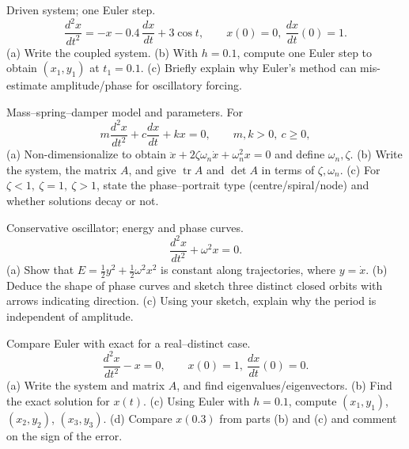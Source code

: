 \documentclass[11pt]{article}
\def\textbf#1{#1}%
\newcounter{question}
\begin{document}
\begin{question}
\textbf{Driven system; one Euler step.}
\[
\frac{d^{2}x}{dt^{2}}=-x-0.4\,\frac{dx}{dt}+3\cos t,\qquad x(0)=0,\ \frac{dx}{dt}(0)=1.
\]
(a) Write the coupled system.  
(b) With \(h=0.1\), compute one Euler step to obtain \((x_1,y_1)\) at \(t_1=0.1\).  
(c) Briefly explain why Euler’s method can mis-estimate amplitude/phase for oscillatory forcing.
\end{question}

\begin{question}
\textbf{Mass–spring–damper model and parameters.}
For
\[
m\frac{d^{2}x}{dt^{2}}+c\frac{dx}{dt}+kx=0,\qquad m,k>0,\ c\ge0,
\]
(a) Non-dimensionalize to obtain \(\ddot x+2\zeta\omega_n \dot x+\omega_n^2 x=0\) and define \(\omega_n,\zeta\).  
(b) Write the system, the matrix \(A\), and give \(\operatorname{tr}A\) and \(\det A\) in terms of \(\zeta,\omega_n\).  
(c) For \(\zeta<1,\ \zeta=1,\ \zeta>1\), state the phase–portrait type (centre/spiral/node) and whether solutions decay or not.
\end{question}

\begin{question}
\textbf{Conservative oscillator; energy and phase curves.}
\[
\frac{d^{2}x}{dt^{2}}+\omega^{2}x=0.
\]
(a) Show that \(E=\tfrac12 y^{2}+\tfrac12 \omega^{2}x^{2}\) is constant along trajectories, where \(y=\dot x\).  
(b) Deduce the shape of phase curves and sketch three distinct closed orbits with arrows indicating direction.  
(c) Using your sketch, explain why the period is independent of amplitude.
\end{question}

\begin{question}
\textbf{Compare Euler with exact for a real–distinct case.}
\[
\frac{d^{2}x}{dt^{2}}-x=0,\qquad x(0)=1,\ \frac{dx}{dt}(0)=0.
\]
(a) Write the system and matrix \(A\), and find eigenvalues/eigenvectors.  
(b) Find the exact solution for \(x(t)\).  
(c) Using Euler with \(h=0.1\), compute \((x_{1},y_{1})\), \((x_{2},y_{2})\), \((x_{3},y_{3})\).  
(d) Compare \(x(0.3)\) from parts (b) and (c) and comment on the sign of the error.
\end{question}
\end{document}
